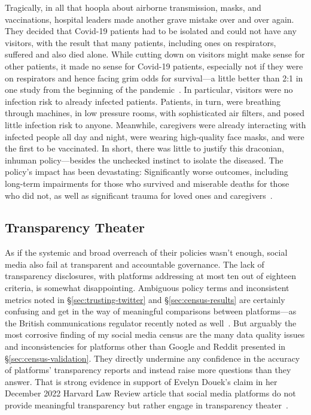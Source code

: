 Tragically, in all that hoopla about airborne transmission, masks, and
vaccinations, hospital leaders made another grave mistake over and over again.
They decided that Covid-19 patients had to be isolated and could not have any
visitors, with the result that many patients, including ones on respirators,
suffered and also died alone. While cutting down on visitors might make sense
for other patients, it made no sense for Covid-19 patients, especially not if
they were on respirators and hence facing grim odds for survival---a little
better than 2:1 in one study from the beginning of the
pandemic~\cite{AuldCaridiScheibleea2020}. In particular, visitors were no
infection risk to already infected patients. Patients, in turn, were breathing
through machines, in low pressure rooms, with sophisticated air filters, and
posed little infection risk to anyone. Meanwhile, caregivers were already
interacting with infected people all day and night, were wearing high-quality
face masks, and were the first to be vaccinated. In short, there was little to
justify this draconian, inhuman policy---besides the unchecked instinct to
isolate the diseased. The policy's impact has been devastating: Significantly
worse outcomes, including long-term impairments for those who survived and
miserable deaths for those who did not, as well as significant trauma for loved
ones and
caregivers~\cite{AndersonShawZar2020,AnnYiAzharea2021,Capozzo2020,DCouto2022,StrangBergstromea2020,WakamMontgomeryea2020}.


\subsection{Transparency Theater}
\label{sec:transparency-theater}

As if the systemic and broad overreach of their policies wasn't enough, social
media also fail at transparent and accountable governance. The lack of
transparency disclosures, with platforms addressing at most ten out of eighteen
criteria, is somewhat disappointing. Ambiguous policy terms and inconsistent
metrics noted in \S\ref{sec:trusting-twitter} and \S\ref{sec:census-results} are
certainly confusing and get in the way of meaningful comparisons between
platforms---as the British communications regulator recently noted as
well~\cite{HarlingHenesyea2023}. But arguably the most corrosive finding of my
social media census are the many data quality issues and inconsistencies for
platforms other than Google and Reddit presented in
\S\ref{sec:census-validation}. They directly undermine any confidence in the
accuracy of platforms' transparency reports and instead raise more questions
than they answer. That is strong evidence in support of Evelyn Douek's claim in
her December 2022 Harvard Law Review article that social media platforms do not
provide meaningful transparency but rather engage in transparency
theater~\cite{Douek2022}.

